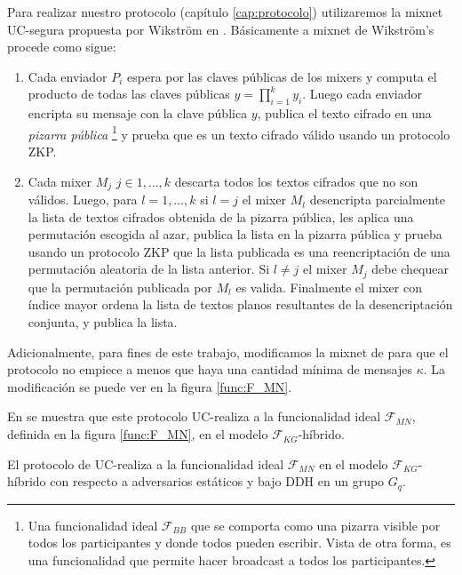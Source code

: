 Para realizar nuestro protocolo (capítulo \ref{cap:protocolo}) utilizaremos la mixnet
UC-segura propuesta por Wikstr\"om en \cite{Wikstrom04a}. Básicamente a mixnet de Wikstr\"om's
procede como sigue:

\begin{enumerate}

\item Cada enviador $P_i$ espera por las claves públicas de los mixers y computa el producto
      de todas las claves públicas $y = \prod_{i=1}^k y_i$. Luego cada enviador encripta su mensaje
      con la clave pública $y$, publica el texto cifrado en una \textit{pizarra pública}
      \footnote{Una funcionalidad ideal $\mathcal{F}_{BB}$ que se comporta como una pizarra visible por todos
      los participantes y donde todos pueden escribir. Vista de otra forma, es una funcionalidad que permite
      hacer broadcast a todos los participantes.}
      y prueba que es un texto cifrado válido usando un protocolo ZKP.
\item Cada mixer $M_j$ $j\in{1, \ldots, k}$ descarta todos los textos cifrados que no son válidos.
      Luego, para $l = 1, \ldots, k$ si $l = j$ el mixer $M_l$ desencripta parcialmente la lista
      de textos cifrados obtenida de la pizarra pública, les aplica una permutación escogida al azar,
      publica la lista en la pizarra pública y prueba usando un protocolo ZKP que la lista publicada
      es una reencriptación de una permutación aleatoria de la lista anterior.
      Si $l \neq j$ el mixer $M_j$ debe chequear que la permutación publicada por $M_l$ es valida.
      Finalmente el mixer con índice mayor ordena la lista de textos planos resultantes de la
      desencriptación conjunta, y publica la lista.

\end{enumerate}

Adicionalmente, para fines de este trabajo, modificamos la mixnet de \cite{Wikstrom04a} para que el protocolo
no empiece a menos que haya una cantidad mínima de mensajes $\kappa$. La modificación se puede ver en 
la figura \ref{func:F_MN}. 

En \cite{mnCompleto} se muestra que este protocolo UC-realiza a la funcionalidad ideal $\mathcal{F}_{MN}$,
definida en la figura \ref{func:F_MN}, en el modelo $\mathcal{F}_{KG}$-híbrido. 

\begin{teorema}
El protocolo de \cite{Wikstrom04a} UC-realiza a la funcionalidad ideal $\mathcal{F}_{MN}$
en el modelo $\mathcal{F}_{KG}$-híbrido con respecto a adversarios estáticos y bajo DDH en un grupo
$G_q$.
\end{teorema}

